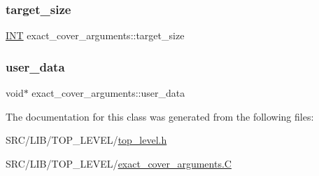 \mbox{\label{classexact__cover__arguments_a74428f3dc2e873b4990b13496a6f4cfb}} 
\subsubsection{\texorpdfstring{target\+\_\+size}{target\_size}}
{\footnotesize\ttfamily \mbox{\hyperlink{galois_8h_a09fddde158a3a20bd2dcadb609de11dc}{I\+NT}} exact\+\_\+cover\+\_\+arguments\+::target\+\_\+size}

\mbox{\label{classexact__cover__arguments_ab54c23f93b0dc645a512765906ab68ef}} 
\subsubsection{\texorpdfstring{user\+\_\+data}{user\_data}}
{\footnotesize\ttfamily void$\ast$ exact\+\_\+cover\+\_\+arguments\+::user\+\_\+data}



The documentation for this class was generated from the following files\+:\begin{DoxyCompactItemize}
\item 
S\+R\+C/\+L\+I\+B/\+T\+O\+P\+\_\+\+L\+E\+V\+E\+L/\mbox{\hyperlink{top__level_8h}{top\+\_\+level.\+h}}\item 
S\+R\+C/\+L\+I\+B/\+T\+O\+P\+\_\+\+L\+E\+V\+E\+L/\mbox{\hyperlink{exact__cover__arguments_8_c}{exact\+\_\+cover\+\_\+arguments.\+C}}\end{DoxyCompactItemize}
